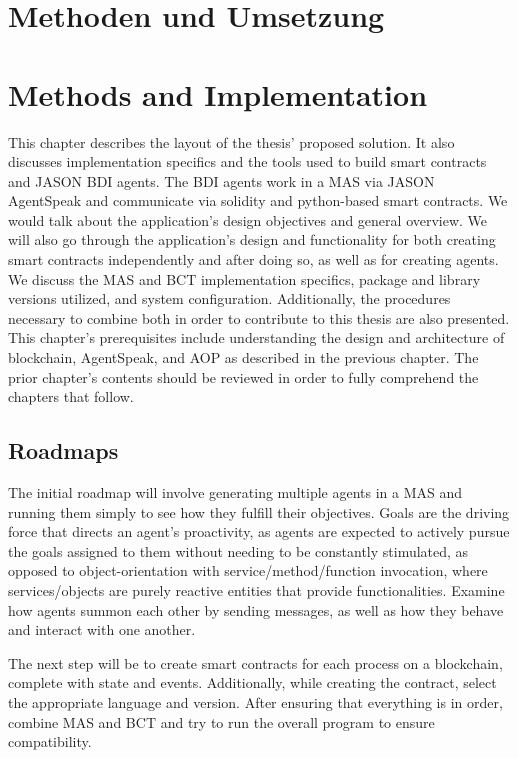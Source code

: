 {\chapter{Methoden und Umsetzung}}
{\chapter{Methods and Implementation}}
\label{sec:methods}


This chapter describes the layout of the thesis' proposed solution. It also discusses implementation specifics and the tools used to build smart contracts and JASON \ac{BDI} agents. The \ac{BDI} agents work in a \ac{MAS} via JASON AgentSpeak and communicate via solidity and python-based smart contracts. We would talk about the application's design objectives and general overview. We will also go through the application's design and functionality for both creating smart contracts independently and after doing so, as well as for creating agents. We discuss the \ac{MAS} and \ac{BCT} implementation specifics, package and library versions utilized, and system configuration. Additionally, the procedures necessary to combine both in order to contribute to this thesis are also presented. This chapter's prerequisites include understanding the design and architecture of blockchain, AgentSpeak, and \ac{AOP} as described in the previous chapter. The prior chapter's contents should be reviewed in order to fully comprehend the chapters that follow.

\section{Roadmaps}

The initial roadmap will involve generating multiple agents in a \ac{MAS} and running them simply to see how they fulfill their objectives. Goals are the driving force that directs an agent's proactivity, as agents are expected to actively pursue the goals assigned to them without needing to be constantly stimulated, as opposed to object-orientation with service/method/function invocation, where services/objects are purely reactive entities that provide functionalities. Examine how agents summon each other by sending messages, as well as how they behave and interact with one another. 

\vspace{.5cm}

The next step will be to create smart contracts for each process on a blockchain, complete with state and events. Additionally, while creating the contract, select the appropriate language and version. After ensuring that everything is in order, combine \ac{MAS} and \ac{BCT} and try to run the overall program to ensure compatibility.

